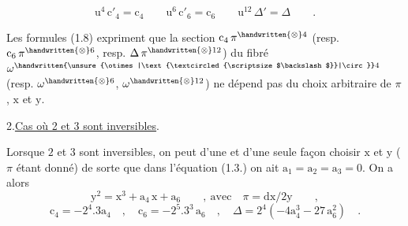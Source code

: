 \[
\mathrm{u}^{4}\,\mathrm{c}'_{4}=\mathrm{c}_{4}\qquad
\mathrm{u}^{6}\,\mathrm{c}'_{6}=\mathrm{c}_{6}\qquad
\mathrm{u}^{12}\,\Delta'=\Delta\qquad.
\tag*{(1.8)}
\]

Les formules (1.8) expriment que la section $\mathrm{c}_{4}\,\pi^{\handwritten{\otimes}4}$ (resp. $\mathrm{c}_{6}\,\pi^{\handwritten{\otimes}6}$, resp. $\Delta\,\pi^{\handwritten{\otimes}12}$) du fibré $\omega^{\handwritten{\unsure{\otimes|\text{\textcircled{\scriptsize$\backslash$}}|\circ}}4}$ (resp. $\omega^{\handwritten{\otimes}6}$, $\omega^{\handwritten{\otimes}12}$) ne dépend pas du choix arbitraire de $\pi$, $\mathrm{x}$ et $\mathrm{y}$.
\par\noindent\hfill
{}
\par\vspace{7.7\baselineskip}

2.\qquad \uline{Cas où 2 et 3 sont inversibles}.\margin{\handwritten{$\backslash$}}

Lorsque $2$ et $3$ sont inversibles, on peut d'une et d'une seule façon choisir $\mathrm{x}$ et $\mathrm{y}$ ($\pi$ étant donné) de sorte que dans l'équation (1.3.) on ait $\mathrm{a}_{1}=\mathrm{a}_{2}=\mathrm{a}_{3}=0$. On a alors
\[
\mathrm{y}^{2}=\mathrm{x}^{3}+\mathrm{a}_{4}\,\mathrm{x}+\mathrm{a}_{6}\qquad,\ \text{avec}\quad\pi=\mathrm{dx}/2\mathrm{y}\qquad,
\tag*{(2.1)}
\]
\[
\mathrm{c}_{4}=-2^{4}.3\mathrm{a}_{4}\quad,\quad
\mathrm{c}_{6}=-2^{5}.3^{3}\,\mathrm{a}_{6}\quad,\quad
\Delta=2^{4}(-4\mathrm{a}_{4}^{3}-27\,\mathrm{a}_{6}^{2})\quad.
\tag*{(2.2)}
\]

